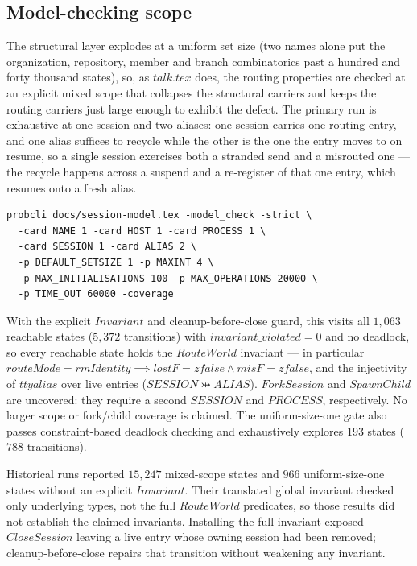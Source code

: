 \documentclass[a4paper,10pt,fleqn]{article}
\begin{document}
\subsection{Model-checking scope}

The structural layer explodes at a uniform set size (two names alone put
the organization, repository, member and branch combinatorics past a
hundred and forty thousand states), so, as $talk.tex$ does, the routing
properties are checked at an explicit mixed scope that collapses the
structural carriers and keeps the routing carriers just large enough to
exhibit the defect.  The primary run is exhaustive at one session and two
aliases: one session carries one routing entry, and one alias suffices
to recycle while the other is the one the entry moves to on resume, so a
single session exercises both a stranded send and a misrouted one --- the
recycle happens across a suspend and a re-register of that one entry,
which resumes onto a fresh alias.

\begin{verbatim}
probcli docs/session-model.tex -model_check -strict \
  -card NAME 1 -card HOST 1 -card PROCESS 1 \
  -card SESSION 1 -card ALIAS 2 \
  -p DEFAULT_SETSIZE 1 -p MAXINT 4 \
  -p MAX_INITIALISATIONS 100 -p MAX_OPERATIONS 20000 \
  -p TIME_OUT 60000 -coverage
\end{verbatim}

With the explicit $Invariant$ and cleanup-before-close guard, this visits
all $1{,}063$ reachable states ($5{,}372$ transitions) with
$invariant\_violated = 0$ and no deadlock, so every reachable state holds
the $RouteWorld$ invariant --- in particular $routeMode = rmIdentity
\implies lostF = zfalse \land misF = zfalse$, and the injectivity of
$ttyalias$ over live entries ($SESSION \pinj ALIAS$).  $ForkSession$ and $SpawnChild$ are uncovered:
they require a second $SESSION$ and $PROCESS$, respectively.  No larger
scope or fork/child coverage is claimed.  The uniform-size-one gate also
passes constraint-based deadlock checking and exhaustively explores
$193$ states ($788$ transitions).

Historical runs reported $15{,}247$ mixed-scope states and $966$
uniform-size-one states without an explicit $Invariant$.  Their translated
global invariant checked only underlying types, not the full $RouteWorld$
predicates, so those results did not establish the claimed invariants.
Installing the full invariant exposed $CloseSession$ leaving a live entry
whose owning session had been removed; cleanup-before-close repairs that
transition without weakening any invariant.
\end{document}

